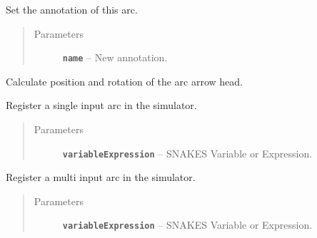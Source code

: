 \documentclass[a4paper,10pt,english]{sphinxmanual}
\begin{document}
\begin{fulllineitems}
\begin{fulllineitems}
\begin{quote}
\begin{description}
\end{description}\end{quote}

\end{fulllineitems}


\begin{fulllineitems}
\label{model_link:model.ArcItem.ArcItem.setName}
Set the annotation of this arc.
\begin{quote}\begin{description}
\item[{Parameters}] \leavevmode
\textbf{\texttt{name}} -- New annotation.

\end{description}\end{quote}

\end{fulllineitems}


\begin{fulllineitems}
\label{model_link:model.ArcItem.ArcItem.setPolygon}
Calculate position and rotation of the arc arrow head.

\end{fulllineitems}


\begin{fulllineitems}
\label{model_link:model.ArcItem.ArcItem.singleInput}
Register a single input arc in the simulator.
\begin{quote}\begin{description}
\item[{Parameters}] \leavevmode
\textbf{\texttt{variableExpression}} -- SNAKES Variable or Expression.

\end{description}\end{quote}

\end{fulllineitems}


\begin{fulllineitems}
\label{model_link:model.ArcItem.ArcItem.singleOutput}
Register a multi input arc in the simulator.
\begin{quote}\begin{description}
\item[{Parameters}] \leavevmode
\textbf{\texttt{variableExpression}} -- SNAKES Variable or Expression.


\end{description}
\end{quote}
\end{fulllineitems}
\end{fulllineitems}
\end{document}
